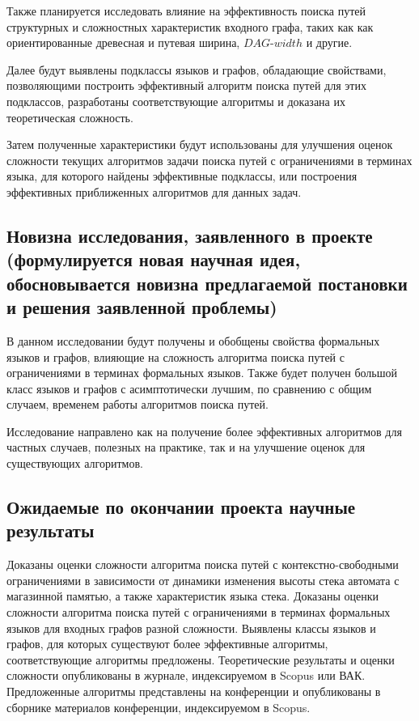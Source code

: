 \documentclass[12pt]{article}  %
\theoremstyle{remark}
\begin{document}
Также планируется исследовать влияние на эффективность поиска путей структурных и сложностных характеристик входного графа, таких как как ориентированные древесная и путевая ширина, $DAG$-$width$ и другие. 

Далее будут выявлены подклассы языков и графов, обладающие свойствами, позволяющими построить эффективный алгоритм поиска путей для этих подклассов, разработаны соответствующие алгоритмы и доказана их теоретическая сложность.

Затем полученные характеристики будут использованы для улучшения оценок сложности текущих алгоритмов задачи поиска путей с ограничениями в терминах языка, для которого найдены эффективные подклассы, или построения эффективных приближенных алгоритмов для данных задач. 
\subsection{Новизна исследования, заявленного в проекте (формулируется новая научная идея, обосновывается новизна предлагаемой постановки и решения заявленной проблемы)}
В данном исследовании будут получены и обобщены свойства формальных языков и графов, влияющие на сложность алгоритма поиска путей с ограничениями в терминах формальных языков. Также будет получен большой класс языков и графов с асимптотически лучшим, по сравнению с общим случаем, временем работы алгоритмов поиска путей.

Исследование направлено как на получение более эффективных алгоритмов для частных случаев, полезных на практике, так и на улучшение оценок для существующих алгоритмов.

\subsection{Ожидаемые по окончании проекта научные результаты}

Доказаны оценки сложности алгоритма поиска путей с контекстно-свободными ограничениями в зависимости от динамики изменения высоты стека автомата с магазинной памятью, а также характеристик языка стека.  Доказаны оценки сложности алгоритма поиска путей с ограничениями в терминах формальных языков для входных графов разной сложности. Выявлены классы языков и графов, для которых существуют более эффективные алгоритмы, соответствующие алгоритмы предложены. Теоретические результаты и оценки сложности опубликованы в журнале, индексируемом в  Scopus или ВАК. Предложенные алгоритмы представлены на конференции и опубликованы в сборнике материалов конференции, индексируемом в Scopus.
\end{document}
